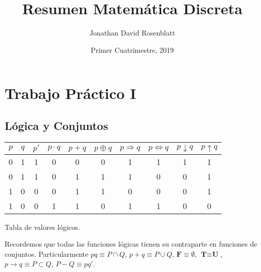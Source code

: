 \documentclass[titlepage,a4paper,12pt,twoside]{article}
\title{Resumen Matemática Discreta}
\author{ Jonathan David Rosenblatt }
\date{ Primer Cuatrimestre, 2019 }
\begin{document}
\maketitle

\newpage
\tableofcontents %

\newpage

\maketitle


\section{Trabajo Práctico I}

\subsection{Lógica y Conjuntos}

\begin{table}[htbp]
\centering
\begin{tabular}{|r|c|c|c|c|c|c|c|c|c|}
\hline
 $p$ & $q$ & $p'$ & $p\cdot q$  & $p+q$ & $p\oplus q$ & $p\Rightarrow q$  & $p\Leftrightarrow q$ & $p\downarrow q$ & $p\uparrow q$ \\
\hline
0 & 1 & 1 & 0 & 0 & 0 & 1 & 1 & 1 & 1 \\
0 & 1 & 1 & 0 & 1 & 1 & 1 & 0 & 0 & 1 \\
1 & 0 & 0 & 0 & 1 & 1 & 0 & 0 & 0 & 1 \\
1 & 0 & 0 & 1 & 1 & 0 & 1 & 1 & 0 & 0 \\

\hline
\end{tabular}
\begin{center}
Tabla de valores lógicos.
\end{center}
\label{tabla}
\end{table}

Recordemos que todas las funciones lógicas tienen su contraparte en funciones de conjuntos. Particularmente $pq \equiv P \cap Q $, $p + q \equiv P \cup Q $, $\textbf{F} \equiv \emptyset $, $\textbf{T} \equiv \textbf{U} $, $p \rightarrow q \equiv P \subset Q $, $ P - Q \equiv pq'.$\\
\end{document}
